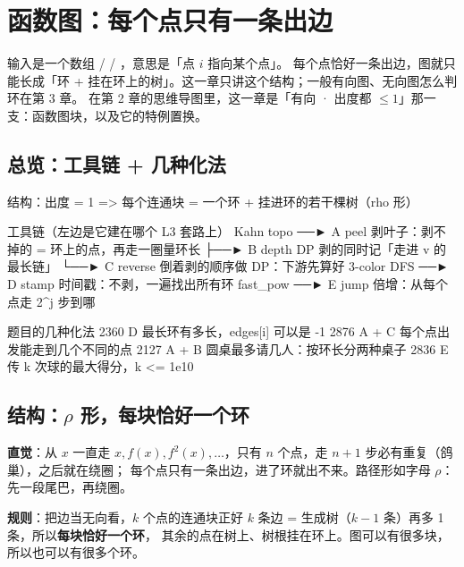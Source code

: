 \section{函数图：每个点只有一条出边}

输入是一个数组  /  / ，意思是「点 $i$ 指向某个点」。
每个点恰好一条出边，图就只能长成「环 + 挂在环上的树」。这一章只讲这个结构；一般有向图、无向图怎么判环在第 3 章。
在第 2 章的思维导图里，这一章是「有向 · 出度都 $\le 1$」那一支：函数图块，以及它的特例置换。

\subsection{总览：工具链 + 几种化法}

\begin{overview}
结构：出度 = 1  =>  每个连通块 = 一个环 + 挂进环的若干棵树（rho 形）

工具链（左边是它建在哪个 L3 套路上）
  Kahn topo    ──► A  peel            剥叶子：剥不掉的 = 环上的点，再走一圈量环长
                   ├──► B  depth DP   剥的同时记「走进 v 的最长链」
                   └──► C  reverse    倒着剥的顺序做 DP：下游先算好
  3-color DFS  ──► D  stamp           时间戳：不剥，一遍找出所有环
  fast_pow     ──► E  jump            倍增：从每个点走 2^j 步到哪

题目的几种化法
  2360   D             最长环有多长，edges[i] 可以是 -1
  2876   A + C         每个点出发能走到几个不同的点
  2127   A + B         圆桌最多请几人：按环长分两种桌子
  2836   E             传 k 次球的最大得分，k <= 1e10
\end{overview}

\subsection{\texorpdfstring{结构：$\rho$ 形，每块恰好一个环}{结构：ρ 形，每块恰好一个环}}

\textbf{直觉}：从 $x$ 一直走 $x, f(x), f^2(x), \dots$，只有 $n$ 个点，走 $n+1$ 步必有重复（鸽巢），之后就在绕圈；
每个点只有一条出边，进了环就出不来。路径形如字母 $\rho$：先一段尾巴，再绕圈。

\textbf{规则}：把边当无向看，$k$ 个点的连通块正好 $k$ 条边 = 生成树（$k-1$ 条）再多 1 条，所以\textbf{每块恰好一个环}，
其余的点在树上、树根挂在环上。图可以有很多块，所以也可以有很多个环。

